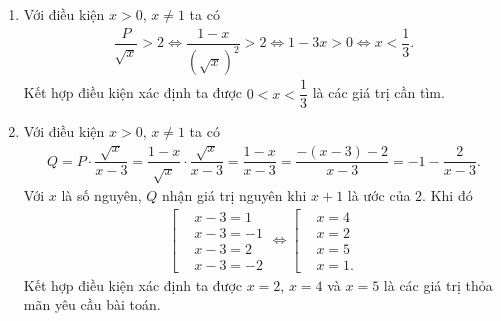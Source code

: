 \begin{bt}
{\begin{enumerate}
\begin{eqnarray*}
				&\Leftrightarrow & x= \dfrac{1}{4}.
			\end{eqnarray*}
			Kết hợp điều kiện xác định ta được $x=\dfrac{1}{4}$ là giá trị thỏa mãn yêu cầu bài toán.
			\item Với điều kiện $x>0$, $x \neq 1$ ta có
			\allowdisplaybreaks
			\begin{eqnarray*}
				\dfrac{P}{\sqrt{x}} > 2 \Leftrightarrow \dfrac{1-x}{\left(\sqrt{x}\right)^2} > 2 \Leftrightarrow 1-3x > 0 \Leftrightarrow x < \dfrac{1}{3}.
			\end{eqnarray*}
			Kết hợp điều kiện xác định ta được $0<x<\dfrac{1}{3}$ là các giá trị cần tìm.
			\item Với điều kiện $x>0$, $x \neq 1$ ta có
			\allowdisplaybreaks
			\begin{eqnarray*}
				Q = P \cdot \dfrac{\sqrt{x}}{x-3} = \dfrac{1-x}{\sqrt{x}} \cdot \dfrac{\sqrt{x}}{x-3} = \dfrac{1-x}{x-3} = \dfrac{-(x-3)-2}{x-3} = -1-\dfrac{2}{x-3}.
			\end{eqnarray*}
			Với $x$ là số nguyên, $Q$ nhận giá trị nguyên khi $x+1$ là ước của $2$. Khi đó
			\allowdisplaybreaks
			\begin{eqnarray*}
				\left[\begin{aligned}&x-3=1 \\&x-3=-1 \\&x-3=2 \\&x-3=-2\end{aligned}\right. \Leftrightarrow \left[\begin{aligned}&x=4 \\&x=2 \\&x=5 \\&x=1.\end{aligned}\right.
			\end{eqnarray*}
			Kết hợp điều kiện xác định ta được $x=2$, $x=4$ và $x=5$ là các giá trị thỏa mãn yêu cầu bài toán.
		\end{enumerate}
	}
\end{bt}

